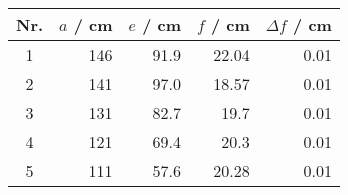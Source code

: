 \begin{tabular}{c|rrrr}
Nr. & $a$ / cm & $e$ / cm & $f$ / cm & $\Delta f$ / cm \\
\hline
1 & 146 & 91.9 & 22.04 & 0.01\\
2 & 141 & 97.0 & 18.57 & 0.01\\
3 & 131 & 82.7 & 19.7 & 0.01\\
4 & 121 & 69.4 & 20.3 & 0.01\\
5 & 111 & 57.6 & 20.28 & 0.01
\end{tabular}
